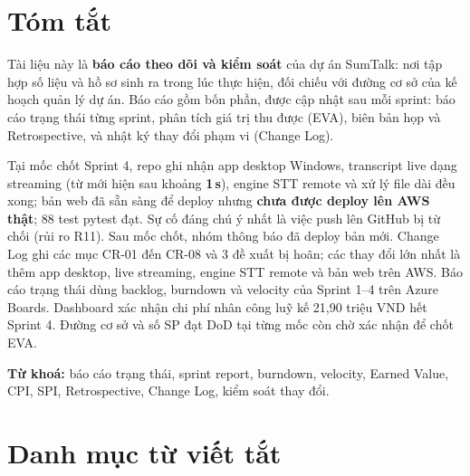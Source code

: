 \documentclass[12pt,a4paper]{report}
\begin{document}
\tableofcontents

\chapter*{Tóm tắt}

Tài liệu này là \textbf{báo cáo theo dõi và kiểm soát} của dự án SumTalk: nơi tập hợp số liệu và hồ sơ sinh ra
trong lúc thực hiện, đối chiếu với đường cơ sở của kế hoạch quản lý dự án. Báo cáo gồm bốn phần, được cập nhật
sau mỗi sprint: báo cáo trạng thái từng sprint, phân tích giá trị thu được (EVA), biên bản họp và Retrospective,
và nhật ký thay đổi phạm vi (Change Log).

Tại mốc chốt Sprint 4, repo ghi nhận app desktop Windows, transcript live dạng streaming (từ mới hiện sau
khoảng \textbf{1\,s}), engine STT remote và xử lý file dài đều xong; bản web đã sẵn sàng để deploy nhưng
\textbf{chưa được deploy lên AWS thật}; 88 test pytest đạt. Sự cố đáng chú ý nhất là việc push lên GitHub bị từ
chối (rủi ro R11). Sau mốc chốt, nhóm thông báo đã deploy bản mới. Change Log ghi các mục CR-01 đến CR-08 và 3 đề xuất bị hoãn; các thay đổi
lớn nhất là thêm app desktop, live streaming, engine STT remote và bản web trên AWS. Báo cáo trạng thái dùng
backlog, burndown và velocity của Sprint 1--4 trên Azure Boards. Dashboard xác nhận chi phí nhân công luỹ kế
21,90 triệu VND hết Sprint 4. Đường cơ sở và số SP đạt DoD tại từng mốc còn chờ xác nhận để chốt EVA.

\textbf{Từ khoá:} báo cáo trạng thái, sprint report, burndown, velocity, Earned Value, CPI, SPI, Retrospective,
Change Log, kiểm soát thay đổi.

\chapter*{Danh mục từ viết tắt}
\end{document}
